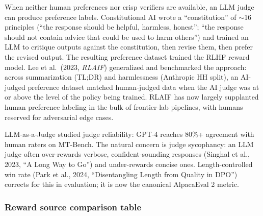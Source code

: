 \documentclass{article}
\begin{document}
When neither human preferences nor crisp verifiers are available, an LLM judge can produce preference labels. Constitutional AI \citep{bai20222022} wrote a ``constitution'' of $\sim$16 principles (``the response should be helpful, harmless, honest''; ``the response should not contain advice that could be used to harm others'') and trained an LLM to critique outputs against the constitution, then revise them, then prefer the revised output. The resulting preference dataset trained the RLHF reward model. Lee et al.~(2023, \emph{RLAIF}) generalized and benchmarked the approach: across summarization (TL;DR) and harmlessness (Anthropic HH split), an AI-judged preference dataset matched human-judged data when the AI judge was at or above the level of the policy being trained. RLAIF has now largely supplanted human preference labeling in the bulk of frontier-lab pipelines, with humans reserved for adversarial edge cases.

LLM-as-a-Judge \citep{zheng20232023} studied judge reliability: GPT-4 reaches 80\%+ agreement with human raters on MT-Bench. The natural concern is judge sycophancy: an LLM judge often over-rewards verbose, confident-sounding responses (Singhal et al., 2023, ``A Long Way to Go'') and under-rewards concise ones. Length-controlled win rate (Park et al., 2024, ``Disentangling Length from Quality in DPO'') corrects for this in evaluation; it is now the canonical AlpacaEval 2 metric.

\subsubsection{Reward source comparison table}\label{reward-source-comparison-table}
\end{document}
